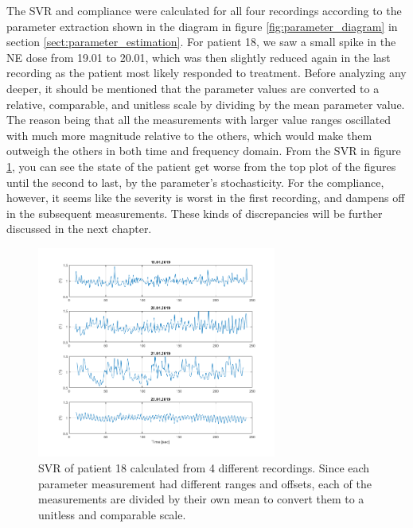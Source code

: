The SVR and compliance were calculated for all four recordings according to the parameter extraction shown in the diagram in figure \ref{fig:parameter_diagram} in section \ref{sect:parameter_estimation}. For patient 18, we saw a small spike in the NE dose from 19.01 to 20.01, which was then slightly reduced again in the last recording as the patient most likely responded to treatment. Before analyzing any deeper, it should be mentioned that the parameter values are converted to a relative, comparable, and unitless scale by dividing by the mean parameter value. The reason being that all the measurements with larger value ranges oscillated with much more magnitude relative to the others, which would make them outweigh the others in both time and frequency domain. From the SVR in figure \ref{fig:resistance_patient18}, you can see the state of the patient get worse from the top plot of the figures until the second to last, by the parameter's stochasticity. For the compliance, however, it seems like the severity is worst in the first recording, and dampens off in the subsequent measurements. These kinds of discrepancies will be further discussed in the next chapter.

\begin{figure}[h!]
    \centering
    \includegraphics[width=0.7\textwidth]{fig/results/resistance_patient18_rel.png}
    \caption{SVR of patient 18 calculated from 4 different recordings. Since each parameter measurement had different ranges and offsets, each of the measurements are divided by their own mean to convert them to a unitless and comparable scale.}
    \label{fig:resistance_patient18}
\end{figure}{}

